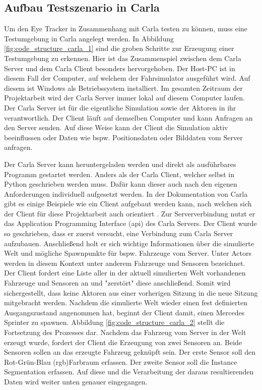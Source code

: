 \subsection{Aufbau Testszenario in Carla}

Um den Eye Tracker in Zusammenhang mit Carla testen zu können, muss eine Testumgebung in Carla angelegt werden. In Abbildung \ref{fig:code_structure_carla_1} sind die groben Schritte zur Erzeugung einer Testumgebung zu erkennen. Hier ist das Zusammenspiel zwischen dem Carla Server und dem Carla Client besonders hervorgehoben. Der Host-PC ist in diesem Fall der Computer, auf welchem der Fahrsimulator ausgeführt wird. Auf diesem ist Windows als Betriebssystem installiert. Im gesamten Zeitraum der Projektarbeit wird der Carla Server immer lokal auf diesem Computer laufen. Der Carla Server ist für die eigentliche Simulation sowie der Aktoren in ihr verantwortlich. Der Client läuft auf demselben Computer und kann Anfragen an den Server senden. Auf diese Weise kann der Client die Simulation aktiv beeinflussen oder Daten wie bspw. Positionsdaten oder Bilddaten vom Server anfragen. \cite{lit_website_carla_documentation}

Der Carla Server kann heruntergeladen werden und direkt als ausführbares Programm gestartet werden. Anders als der Carla Client, welcher selbst in Python geschrieben werden muss. Dafür kann dieser auch nach den eigenen Anforderungen individuell aufgesetzt werden. In der Dokumentation von Carla gibt es einige Beispiele wie ein Client aufgebaut werden kann, nach welchen sich der Client für diese Projektarbeit auch orientiert \cite{lit_code_api}. Zur Serververbindung nutzt er das Application Programming Interface (\acrshort{api}) des Carla Servers. Der Client wurde so geschrieben, dass er zuerst versucht, eine Verbindung zum Carla Server aufzubauen. Anschließend holt er sich wichtige Informationen über die simulierte Welt und mögliche \gls{Spawnpunkt}e für bspw. Fahrzeuge vom Server. Unter Actors werden in diesem Kontext unter anderem Fahrzeuge und Sensoren bezeichnet. Der Client fordert eine Liste aller in der aktuell simulierten Welt vorhandenen Fahrzeuge und Sensoren an und "zerstört" diese anschließend. Somit wird sichergestellt, dass keine Aktoren aus einer vorherigen Sitzung in die neue Sitzung mitgebracht werden. Nachdem die simulierte Welt wieder einen fest definierten Ausgangszustand angenommen hat, beginnt der Client damit, einen Mercedes Sprinter zu spawnen. Abbildung \ref{fig:code_structure_carla_2} stellt die Fortsetzung des Prozesses dar. Nachdem das Fahrzeug vom Server in der Welt erzeugt wurde, fordert der Client die Erzeugung von zwei Sensoren an. Beide Sensoren sollen an das erzeugte Fahrzeug geknüpft sein. Der erste Sensor soll den Rot-Grün-Blau (\acrshort{rgb})Farbraum erfassen. Der zweite Sensor soll die Instance Segmentation erfassen. Auf diese und die Verarbeitung der daraus resultierenden Daten wird weiter unten genauer eingegangen. 

